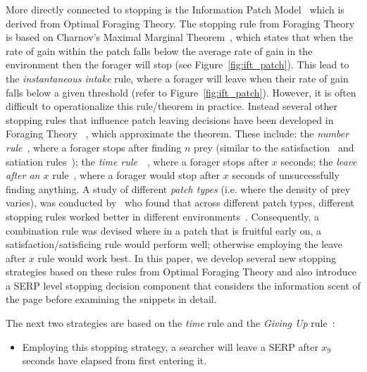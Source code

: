 More directly connected to stopping is the Information Patch Model~\cite{pirolli1999ift} which is derived from Optimal Foraging Theory. The stopping rule from Foraging Theory is based on Charnov's Maximal Marginal Theorem~\cite{charnov1976mvt}, which states that when the rate of gain within the patch falls below the average rate of gain in the environment then the forager will stop (see Figure~\ref{fig:ift_patch}). This lead to the \emph{instantaneous intake} rule, where a forager will leave when their rate of gain falls below a given threshold (refer to Figure~\ref{fig:ift_patch}). However, it is often difficult to operationalize this rule/theorem in practice. Instead several other stopping rules that influence patch leaving decisions have been developed in Foraging Theory ~\citet{stephens1986foraging_theory}, which approximate the theorem. These  include: the \emph{number rule}~\cite{gibbs1958number_rule}, where a forager stops after finding $n$ prey (similar to the satisfaction~\cite{cooper1973retrieval_effectiveness} and satiation rules~\cite{kraft1979stopping_rules}); the \emph{time rule}~\cite{krebs1973time_rule}~\cite{charles1972behaviour}, where a forager stops after $x$ seconds; the \emph{leave after an $x$} rule~\cite{krebs1974leave_after_rule}, where a forager would stop after $x$ seconds of unsuccessfully finding anything. A study of different \emph{patch types} (i.e. where the density of prey varies), was conducted by~\citet{mcnair1982gut_mvt} who found that across different patch types, different stopping rules worked better in different environments~\cite{mcnair1982gut_mvt, green1984oft_stopping, iwasa1981prey_distribution}. Consequently, a combination rule was devised where in a patch that is fruitful early on, a satisfaction/satisficing rule would perform well; otherwise employing the leave after $x$ rule would work best. In this paper, we develop several new stopping strategies based on these rules from Optimal Foraging Theory and also introduce a SERP level stopping decision component that considers the information scent of the page before examining the snippets in detail.

The next two strategies are based on the \emph{time} rule and the \emph{Giving Up} rule~\cite{gibbs1958number_rule}:

\begin{itemize}
    \item[\blueboxbold{SS9}] Employing this stopping strategy, a searcher will leave a SERP after $x_9$ seconds have elapsed from first entering it.
\end{itemize}


